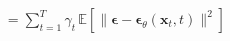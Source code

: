 \documentclass[preview]{standalone}
\begin{document}
\begin{align*}
= \sum_{t=1}^{T} \gamma_t \, \mathbb{E} \left[ \| \boldsymbol{\epsilon} - \boldsymbol{\epsilon}_\theta(\mathbf{x}_t, t) \|^2 \right]
\end{align*}
\end{document}
